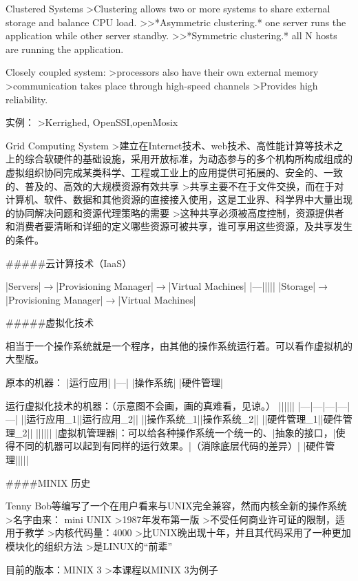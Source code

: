 Clustered Systems
>Clustering allows two or more systems to share external storage and balance CPU load.
>>*Asymmetric clustering.* one server runs the application while other server standby.
>>*Symmetric clustering.* all N hosts are running the application.

Closely coupled system:
>processors also have their own external memory
>communication takes place through high-speed channels
>Provides high reliability.

实例：
>Kerrighed, OpenSSI,openMosix

Grid Computing System
>建立在Internet技术、web技术、高性能计算等技术之上的综合软硬件的基础设施，采用开放标准，为动态参与的多个机构所构成组成的虚拟组织协同完成某类科学、工程或工业上的应用提供可拓展的、安全的、一致的、普及的、高效的大规模资源有效共享
>共享主要不在于文件交换，而在于对计算机、软件、数据和其他资源的直接接入使用，这是工业界、科学界中大量出现的协同解决问题和资源代理策略的需要
>这种共享必须被高度控制，资源提供者和消费者要清晰和详细的定义哪些资源可被共享，谁可享用这些资源，及共享发生的条件。

#####云计算技术（IaaS）

|Servers|$\to$|Provisioning Manager|$\to$|Virtual Machines|
|---|||||
|Storage|$\to$|Provisioning Manager|$\to$|Virtual Machines|

#####虚拟化技术

相当于一个操作系统就是一个程序，由其他的操作系统运行着。可以看作虚拟机的大型版。

原本的机器：
|运行应用|
|---|
|操作系统|
|硬件管理|

运行虚拟化技术的机器：（示意图不会画，画的真难看，见谅。）
||||||
|---|---|---|---|---|
||运行应用_1||运行应用_2||
||操作系统_1||操作系统_2||
||硬件管理_1||硬件管理_2||
||||||
|虚拟机管理器|：可以给各种操作系统一个统一的、|抽象的接口，|使得不同的机器可以起到有同样的运行效果。|（消除底层代码的差异）|
|硬件管理|||||

####MINIX 历史

Tenny Bob等编写了一个在用户看来与UNIX完全兼容，然而内核全新的操作系统
>名字由来： mini UNIX
>1987年发布第一版
>不受任何商业许可证的限制，适用于教学
>内核代码量：4000
>比UNIX晚出现十年，并且其代码采用了一种更加模块化的组织方法
>是LINUX的“前辈”

目前的版本：MINIX 3
>本课程以MINIX 3为例子
